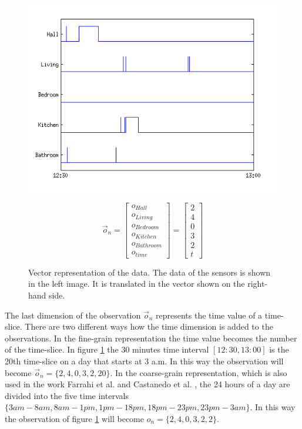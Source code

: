 \begin{figure}[h]
\centering
\begin{minipage}{0.55\linewidth}
\centering
\includegraphics[width=\textwidth]{Pictures/FeatExample.png}
\end{minipage}
\begin{minipage}{0.35\linewidth}
\centering
\begin{equation*}
\vec{o}_n = 
 \begin{bmatrix} 
 o_{Hall}\\
 o_{Living}\\
 o_{Bedroom}\\
 o_{Kitchen}\\
 o_{Bathroom}\\
 o_{time}
 \end{bmatrix}
 =
  \begin{bmatrix} 
 2\\
 4\\
 0\\
 3\\
 2\\
 t
 \end{bmatrix}
\end{equation*}
\end{minipage}
\caption{Vector representation of the data. The data of the sensors is shown in the left image. It is translated in the vector shown on the right-hand side.}
\label{fig:FeatEx}
\end{figure}

The last dimension of the observation $\vec{o}_n$ represents the time value of a time-slice. There are two different ways how the time dimension is added to the observations. In the fine-grain representation the time value becomes the number of the time-slice. In figure \ref{fig:FeatEx} the 30 minutes time interval $[12:30,13:00]$ is the 20th time-slice on a day that starts at 3 a.m. In this way the observation will become $\vec{o}_n=\{2,4,0,3,2,20\}$. In the coarse-grain representation, which is also used in the work Farrahi et al. \cite{farrahi2008daily} and Castanedo et al. \cite{EXSY:EXSY12033}, the 24 hours of a day are divided into the five time intervals $\{ 3am - 8am, 8am - 1pm, 1pm - 18pm, 18pm - 23pm, 23pm - 3am  \}$. In this way the observation of figure \ref{fig:FeatEx} will become $o_n=\{2,4,0,3,2,2\}$.\\

